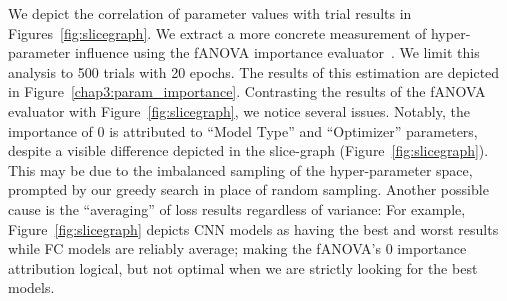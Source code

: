 \documentclass[\main/thesis.tex]{subfiles}
\begin{document}
We depict the correlation of parameter values with trial results in Figures~\ref{fig:slicegraph}. We extract a more concrete measurement of hyper-parameter influence using the fANOVA importance evaluator~\cite{hutter2014efficient}. We limit this analysis to 500 trials with 20 epochs. The results of this estimation are depicted in Figure~\ref{chap3:param_importance}. Contrasting the results of the fANOVA evaluator with Figure~\ref{fig:slicegraph}, we notice several issues. Notably, the importance of 0 is attributed to \enquote{Model Type} and \enquote{Optimizer} parameters, despite a visible difference depicted in the slice-graph (Figure~\ref{fig:slicegraph}). This may be due to the imbalanced sampling of the hyper-parameter space, prompted by our greedy search in place of random sampling. Another possible cause is the \enquote{averaging} of loss results regardless of variance: For example, Figure~\ref{fig:slicegraph} depicts CNN models as having the best and worst results while FC models are reliably average; making the fANOVA's 0 importance attribution logical, but not optimal when we are strictly looking for the best models. 
\end{document}
